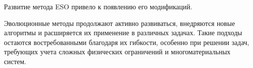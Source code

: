 Развитие метода ESO привело к появлению его модификаций. 
%
%

Эволюционные методы продолжают активно развиваться, внедряются новые алгоритмы и расширяется их применение в различных задачах. Такие подходы остаются востребованными благодаря их гибкости, особенно при решении задач, требующих учета сложных физических ограничений и многоматериальных систем.



